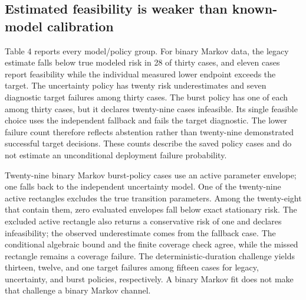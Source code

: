 \documentclass[11pt,a4paper]{article}
\begin{document}
\subsection{Estimated feasibility is weaker than known-model calibration}
Table 4 reports every model/policy group. For binary Markov data, the legacy estimate falls below true modeled risk in 28 of thirty cases, and eleven cases report feasibility while the individual measured lower endpoint exceeds the target. The uncertainty policy has twenty risk underestimates and seven diagnostic target failures among thirty cases. The burst policy has one of each among thirty cases, but it declares twenty-nine cases infeasible. Its single feasible choice uses the independent fallback and fails the target diagnostic. The lower failure count therefore reflects abstention rather than twenty-nine demonstrated successful target decisions. These counts describe the saved policy cases and do not estimate an unconditional deployment failure probability.

Twenty-nine binary Markov burst-policy cases use an active parameter envelope; one falls back to the independent uncertainty model. One of the twenty-nine active rectangles excludes the true transition parameters. Among the twenty-eight that contain them, zero evaluated envelopes fall below exact stationary risk. The excluded active rectangle also returns a conservative risk of one and declares infeasibility; the observed underestimate comes from the fallback case. The conditional algebraic bound and the finite coverage check agree, while the missed rectangle remains a coverage failure. The deterministic-duration challenge yields thirteen, twelve, and one target failures among fifteen cases for legacy, uncertainty, and burst policies, respectively. A binary Markov fit does not make that challenge a binary Markov channel.
\end{document}

